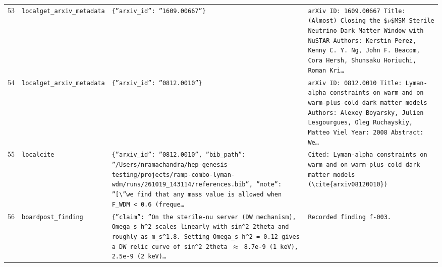 \documentclass[11pt,a4paper]{article}
\begin{document}
\begin{longtable}{@{}p{}p{}p{}p{}@{}}
53 & \texttt{local}\newline\texttt{get\_\allowbreak{}arxiv\_\allowbreak{}metadata} & \texttt{\{''arxiv\_\allowbreak{}id'':\allowbreak{} ''1609.00667''\}\allowbreak{}} & \texttt{arXiv ID:\allowbreak{} 1609.00667 Title:\allowbreak{} (Almost)\allowbreak{} Closing the \$$\nu$\$MSM Sterile Neutrino Dark Matter Window with NuSTAR Authors:\allowbreak{} Kerstin Perez,\allowbreak{} Kenny C. Y. Ng,\allowbreak{} John F. Beacom,\allowbreak{} Cora Hersh,\allowbreak{} Shunsaku Horiuchi,\allowbreak{} Roman Kri\ldots{}\allowbreak{}} \\
54 & \texttt{local}\newline\texttt{get\_\allowbreak{}arxiv\_\allowbreak{}metadata} & \texttt{\{''arxiv\_\allowbreak{}id'':\allowbreak{} ''0812.0010''\}\allowbreak{}} & \texttt{arXiv ID:\allowbreak{} 0812.0010 Title:\allowbreak{} Lyman-alpha constraints on warm and on warm-plus-cold dark matter models Authors:\allowbreak{} Alexey Boyarsky,\allowbreak{} Julien Lesgourgues,\allowbreak{} Oleg Ruchayskiy,\allowbreak{} Matteo Viel Year:\allowbreak{} 2008 Abstract:\allowbreak{}   We\ldots{}\allowbreak{}} \\
55 & \texttt{local}\newline\texttt{cite} & \texttt{\{''arxiv\_\allowbreak{}id'':\allowbreak{} ''0812.0010'',\allowbreak{} ''bib\_\allowbreak{}path'':\allowbreak{} ''/\allowbreak{}Users/\allowbreak{}nramachandra/\allowbreak{}hep-genesis-testing/\allowbreak{}projects/\allowbreak{}ramp-combo-lyman-wdm/\allowbreak{}runs/\allowbreak{}261019\_\allowbreak{}143114/\allowbreak{}references.bib'',\allowbreak{} ''note'':\allowbreak{} ''[\textbackslash{}\allowbreak{}''we find that any mass value is allowed when F\_\allowbreak{}WDM \textless{}\allowbreak{} 0.6 (freque\ldots{}\allowbreak{}} & \texttt{Cited:\allowbreak{} Lyman-alpha constraints on warm and on warm-plus-cold dark matter models (\textbackslash{}\allowbreak{}cite\{arxiv08120010\}\allowbreak{})\allowbreak{}} \\
56 & \texttt{board}\newline\texttt{post\_\allowbreak{}finding} & \texttt{\{''claim'':\allowbreak{} ''On the sterile-nu server (DW mechanism)\allowbreak{},\allowbreak{} Omega\_\allowbreak{}s h\textasciicircum{}\allowbreak{}2 scales linearly with sin\textasciicircum{}\allowbreak{}2 2theta and roughly as m\_\allowbreak{}s\textasciicircum{}\allowbreak{}1.8. Setting Omega\_\allowbreak{}s h\textasciicircum{}\allowbreak{}2 =\allowbreak{} 0.12 gives a DW relic curve of sin\textasciicircum{}\allowbreak{}2 2theta $\approx$ 8.7e-9 (1 keV)\allowbreak{},\allowbreak{} 2.5e-9 (2 keV)\allowbreak{}\ldots{}\allowbreak{}} & \texttt{Recorded finding f-003.} \\

\end{longtable}
\end{document}
